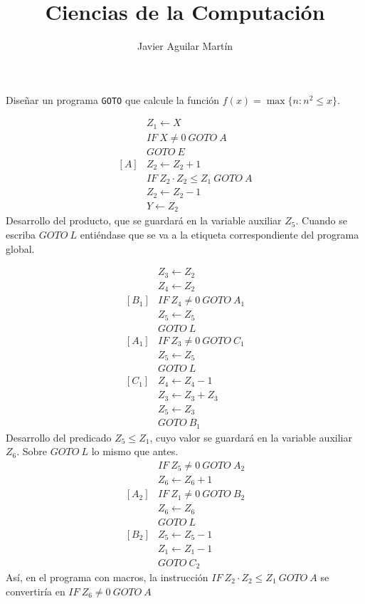 \documentclass[twoside]{article}
\begin{document}
\title{Ciencias de la Computación}

\author{Javier Aguilar Martín}
\maketitle

\begin{ejercicio}{3}
Diseñar un programa \texttt{GOTO} que calcule la función $f(x) = \max\{n : n^2 \leq x\}$.
\end{ejercicio}
\begin{solucion}
\begin{align*}
& Z_1\leftarrow X\\
&IF\ X\neq 0\ GOTO\ A\\
&GOTO\ E\\
[A] & Z_2\leftarrow Z_2+1\\
& IF\ Z_2\cdot Z_2 \leq Z_1\ GOTO\ A\\
& Z_2\leftarrow Z_2-1\\
& Y\leftarrow Z_2
\end{align*}
Desarrollo del producto, que se guardará en la variable auxiliar $Z_5$. Cuando se escriba $GOTO\ L$ entiéndase que se va a la etiqueta correspondiente del programa global.

\begin{align*}
&Z_3\leftarrow Z_2\\
&Z_4\leftarrow Z_2\\
[B_1] & IF\ Z_4\neq 0\ GOTO\ A_1\\
& Z_5\leftarrow Z_5\\
& GOTO\ L\\
[A_1] & IF\ Z_3\neq 0\ GOTO\ C_1\\
& Z_5\leftarrow Z_5\\
& GOTO\ L\\
[C_1] & Z_4\leftarrow Z_4-1\\
& Z_3\leftarrow Z_3+Z_3\\
&Z_5\leftarrow Z_3\\
& GOTO\ B_1
\end{align*}
Desarrollo del predicado $Z_5\leq Z_1$, cuyo valor se guardará en la variable auxiliar $Z_6$. Sobre $GOTO\ L$ lo mismo que antes.
\begin{align*}
[C_2]& IF\ Z_5\neq 0\ GOTO\ A_2\\
& Z_6\leftarrow Z_6+1\\
[A_2] & IF\ Z_1\neq 0\ GOTO\ B_2\\
& Z_6\leftarrow Z_6\\
&GOTO\ L\\
[B_2] & Z_5\leftarrow Z_5- 1\\
& Z_1\leftarrow Z_1-1\\
&GOTO\ C_2
\end{align*}
Así, en el programa con macros, la instrucción $IF\ Z_2\cdot Z_2 \leq Z_1\ GOTO\ A$ se convertiría en $IF\ Z_6\neq 0\ GOTO\ A$
\end{solucion}
\end{document}
